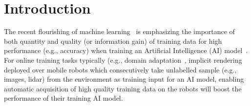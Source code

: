 \section{Introduction}
The recent flourishing of machine learning~\cite{chowdhary_natural_2020,brown_language_2020,openai_gpt-4_2023} is emphasizing the importance of both quantity and quality (or information gain) of training data for high performance (e.g., accuracy) when training an Artificial Intelligence (AI) model~\cite{zha_data-centric_2023}.
For online training tasks typically (e.g., domain adaptation~\cite{wilson_survey_2020,ahmed_unsupervised_2021}, implicit rendering~\cite{li2022bnvfusion,sucar_imap_2021,zhu_nice-slam_2022} deployed over mobile robots which consecutively take unlabelled sample (e.g., images, lidar) from the environment as training input for an AI model, enabling automatic acquisition of high quality training data on the robots will boost the performance of their training AI model.


